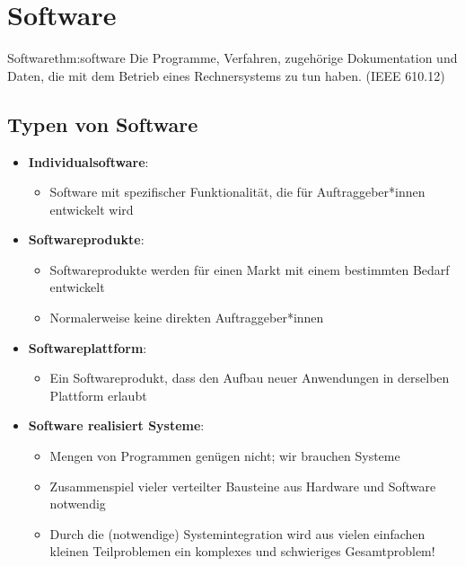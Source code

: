 \documentclass[main.tex]{subfiles}
\begin{document}
\section{Software}
\begin{myTheorem}{Software}{thm:software}
  Die Programme, Verfahren, zugehörige
Dokumentation und Daten, die mit dem Betrieb
eines Rechnersystems zu tun haben. (IEEE 610.12)
\end{myTheorem}
\subsection*{Typen von Software}
\begin{itemize}
    \item \textbf{Individualsoftware}: 
    \begin{itemize}
        \item Software mit spezifischer Funktionalität, die für Auftraggeber*innen entwickelt wird
    \end{itemize}
    \item \textbf{Softwareprodukte}: 
    \begin{itemize}
        \item Softwareprodukte werden für einen Markt mit einem bestimmten Bedarf entwickelt
        \item Normalerweise keine direkten Auftraggeber*innen
    \end{itemize}
    \item \textbf{Softwareplattform}: 
    \begin{itemize}
        \item Ein Softwareprodukt, dass den Aufbau neuer Anwendungen in derselben Plattform erlaubt
    \end{itemize}
    \item \textbf{Software realisiert Systeme}:
    \begin{itemize}
        \item Mengen von Programmen genügen nicht; wir brauchen Systeme
        \item Zusammenspiel vieler verteilter Bausteine aus Hardware und Software notwendig
        \item Durch die (notwendige) Systemintegration wird aus vielen einfachen kleinen Teilproblemen ein komplexes und schwieriges Gesamtproblem!
    \end{itemize}
\end{itemize}
\end{document}
